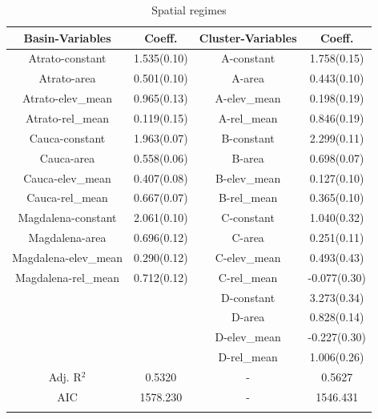 
\begin{table}[htbp]\centering
\caption{Spatial regimes}
\label{tab:regimes}
\begin{tabular}{c c c c}
\toprule
\textbf{Basin-Variables} & \textbf{Coeff.} & \textbf{Cluster-Variables} & \textbf{Coeff.} \\ 
\midrule
Atrato-constant & 1.535(0.10) & A-constant & 1.758(0.15) \\
Atrato-area & 0.501(0.10) & A-area & 0.443(0.10) \\
Atrato-elev_mean & 0.965(0.13) & A-elev_mean & 0.198(0.19) \\
Atrato-rel_mean & 0.119(0.15) & A-rel_mean & 0.846(0.19) \\
Cauca-constant & 1.963(0.07) & B-constant & 2.299(0.11) \\
Cauca-area & 0.558(0.06) & B-area & 0.698(0.07) \\
Cauca-elev_mean & 0.407(0.08) & B-elev_mean & 0.127(0.10) \\
Cauca-rel_mean & 0.667(0.07) & B-rel_mean & 0.365(0.10) \\
Magdalena-constant & 2.061(0.10) & C-constant & 1.040(0.32) \\
Magdalena-area & 0.696(0.12) & C-area & 0.251(0.11) \\
Magdalena-elev_mean & 0.290(0.12) & C-elev_mean & 0.493(0.43) \\
Magdalena-rel_mean & 0.712(0.12) & C-rel_mean & -0.077(0.30) \\
\ & \ & D-constant & 3.273(0.34) \\
\ & \ & D-area & 0.828(0.14) \\
\ & \ & D-elev_mean & -0.227(0.30) \\
\ & \ & D-rel_mean & 1.006(0.26) \\
Adj. R$^{2}$ & 0.5320 & - & 0.5627 \\
AIC & 1578.230 & - & 1546.431 \\
\midrule
\bottomrule
\addlinespace[1ex]
\multicolumn{3}{l}{\textbf{$p<0.05$}, (standard errors)}
\end{tabular}
\end{table}

